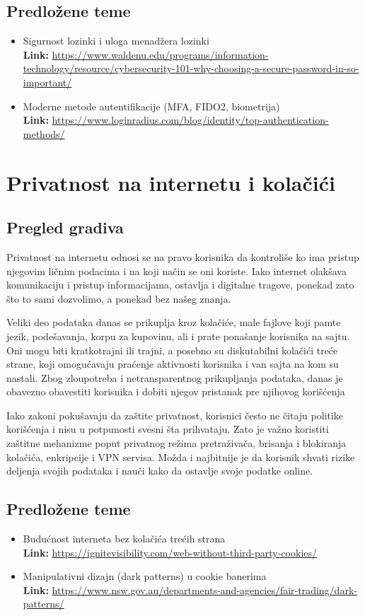 \documentclass[a4paper,12pt]{article}
\begin{document}
\subsection{Predložene teme}
\begin{itemize}
  \item Sigurnost lozinki i uloga menadžera lozinki \\
  \textbf{Link:} \url{https://www.waldenu.edu/programs/information-technology/resource/cybersecurity-101-why-choosing-a-secure-password-in-so-important/}
  \item Moderne metode autentifikacije (MFA, FIDO2, biometrija) \\
  \textbf{Link:} \url{https://www.loginradius.com/blog/identity/top-authentication-methods/}
\end{itemize}

\section{Privatnost na internetu i kolačići}
\subsection{Pregled gradiva}
Privatnost na internetu odnosi se na pravo korisnika da kontroliše ko ima pristup njegovim ličnim podacima i na koji način se oni koriste. Iako internet olakšava komunikaciju i pristup informacijama, ostavlja i digitalne tragove, ponekad zato što to sami dozvolimo, a ponekad bez našeg znanja.

Veliki deo podataka danas se prikuplja kroz kolačiće, male fajlove koji pamte jezik, podešavanja, korpu za kupovinu, ali i prate ponašanje korisnika na sajtu. Oni mogu biti kratkotrajni ili trajni, a posebno su diskutabilni kolačići treće strane, koji omogućavaju praćenje aktivnosti korisnika i van sajta na kom su nastali. Zbog zloupotreba i netransparentnog prikupljanja podataka, danas je obavezno obavestiti korisnika i dobiti njegov pristanak pre njihovog korišćenja

Iako zakoni pokušavaju da zaštite privatnost, korisnici često ne čitaju politike korišćenja i nisu u potpunosti svesni šta prihvataju. Zato je važno koristiti zaštitne mehanizme poput privatnog režima pretraživača, brisanja i blokiranja kolačića, enkripcije i VPN servisa. Možda i najbitnije je da korisnik shvati rizike deljenja svojih podataka i nauči kako da ostavlje svoje podatke online.

\subsection{Predložene teme}
\begin{itemize}
  \item Budućnost interneta bez kolačića trećih strana \\
  \textbf{Link:} \url{https://ignitevisibility.com/web-without-third-party-cookies/}
  \item Manipulativni dizajn (dark patterns) u cookie banerima \\
  \textbf{Link:} \url{https://www.nsw.gov.au/departments-and-agencies/fair-trading/dark-patterns/}
\end{itemize}
\end{document}
